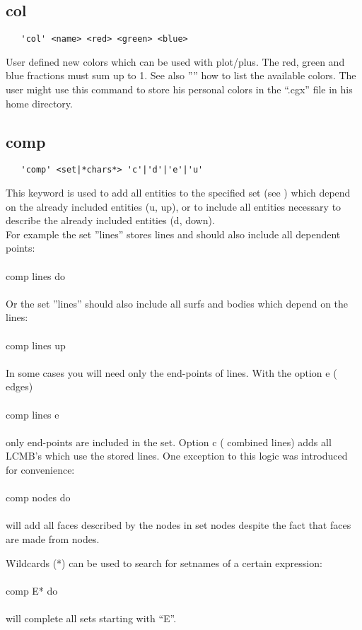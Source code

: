 \documentclass{article}
\begin{document}
\subsection{\label{col}col}
\begin{verbatim}
   'col' <name> <red> <green> <blue>
\end{verbatim}
User defined new colors which can be used with plot/plus. The red, green and blue fractions must sum up to 1. See also '''' how to list the available colors. The user might use this command to store his personal colors in the ``.cgx'' file in his home directory.

\subsection{\label{comp}comp}
\begin{verbatim}
   'comp' <set|*chars*> 'c'|'d'|'e'|'u'
\end{verbatim}
This keyword is used to add all entities to the specified set (see
) which depend on the already included entities (u, up),
or to include all entities necessary to describe the already included entities
(d, down).\\For example the set ''lines'' stores lines and should also include
all dependent points:\\\\comp lines do\\\\Or the set ''lines'' should also
include all surfs and bodies which depend on the lines:\\\\comp lines up\\\\In
some cases you will need only the end-points of lines. With the option e (
edges)\\\\comp lines e\\\\ only end-points are included in the set. Option c (
combined lines) adds all LCMB's which use the stored lines. One exception to this logic was introduced for convenience:\\\\comp nodes do\\\\will add all faces described by the nodes in set nodes despite the fact that faces are made from nodes.

Wildcards (*) can be used to search for setnames of a certain expression:\\\\comp E* do\\\\will complete all sets starting with ``E''.
\end{document}
